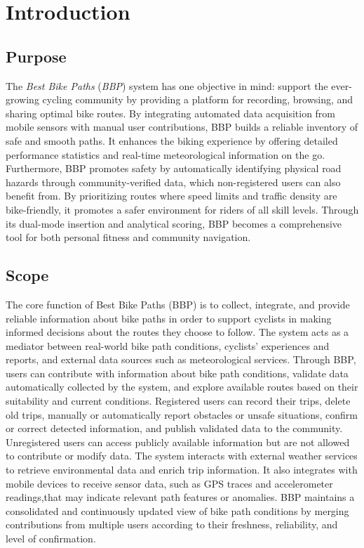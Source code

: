 \section{Introduction}
\subsection{Purpose} %
The \textit{Best Bike Paths} (\textit{BBP}) system has one objective in mind: support the ever-growing cycling community by providing a platform for recording, browsing, and sharing optimal bike routes. By integrating automated data acquisition from mobile sensors with manual user contributions, BBP builds a reliable inventory of safe and smooth paths. It enhances the biking experience by offering detailed performance statistics and real-time meteorological information on the go. Furthermore, BBP promotes safety by automatically identifying physical road hazards through community-verified data, which non-registered users can also benefit from. By prioritizing routes where speed limits and traffic density are bike-friendly, it promotes a safer environment for riders of all skill levels. Through its dual-mode insertion and analytical scoring, BBP becomes a comprehensive tool for both personal fitness and community navigation.

\subsection{Scope} %
The core function of Best Bike Paths (BBP) is to collect, integrate, and provide reliable information about bike paths in order to support cyclists in making informed decisions about the routes they choose to follow. The system acts as a mediator between real-world bike path conditions, cyclists’ experiences and reports, and external data sources such as meteorological services.
Through BBP, users can contribute with information about bike path conditions, validate data automatically collected by the system, and explore available routes based on their suitability and current conditions. Registered users can record their trips, delete old trips,  manually or automatically report obstacles or unsafe situations, confirm or correct detected information, and publish validated data to the community. Unregistered users can access publicly available information but are not allowed to contribute or modify data.
The system interacts with external weather services to retrieve environmental data and enrich trip information. It also integrates with mobile devices to receive sensor data, such as GPS traces and accelerometer readings,that may indicate relevant path features or anomalies. BBP maintains a consolidated and continuously updated view of bike path conditions by merging contributions from multiple users according to their freshness, reliability, and level of confirmation.

